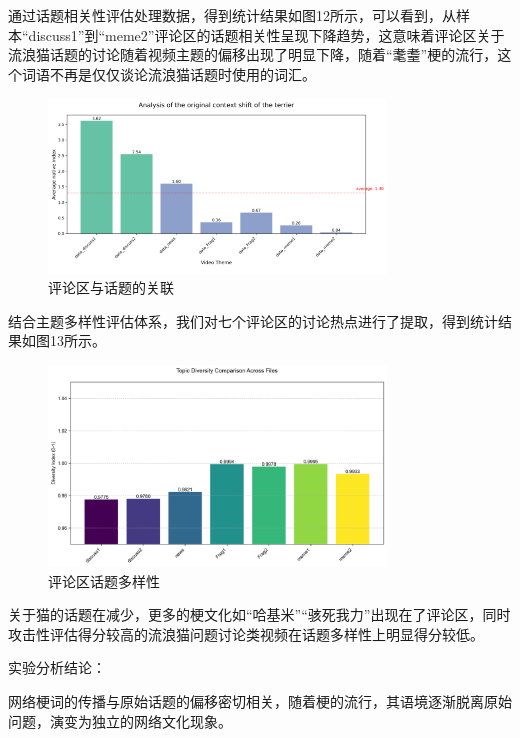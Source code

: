 \documentclass[12pt,a4paper]{ctexart}
\begin{document}
通过话题相关性评估处理数据，得到统计结果如图12所示，可以看到，从样本“discuss1”到“meme2”评论区的话题相关性呈现下降趋势，这意味着评论区关于流浪猫话题的讨论随着视频主题的偏移出现了明显下降，随着“耄耋”梗的流行，这个词语不再是仅仅谈论流浪猫话题时使用的词汇。

\begin{figure}[htbp]
    \centering
    \includegraphics[width=0.8\textwidth]{img/comment_area_vs_topic.png}
    \caption{评论区与话题的关联}
    \label{fig:comment_area_vs_topic}
\end{figure}

结合主题多样性评估体系，我们对七个评论区的讨论热点进行了提取，得到统计结果如图13所示。

\begin{figure}[htbp]
    \centering
    \includegraphics[width=0.8\textwidth]{img/comment_area_vs_hot_topic.png}
    \caption{评论区话题多样性}
    \label{fig:comment_area_vs_hot_topic}
\end{figure}

关于猫的话题在减少，更多的梗文化如“哈基米”“骇死我力”出现在了评论区，同时攻击性评估得分较高的流浪猫问题讨论类视频在话题多样性上明显得分较低。

实验分析结论：

网络梗词的传播与原始话题的偏移密切相关，随着梗的流行，其语境逐渐脱离原始问题，演变为独立的网络文化现象。
\end{document}
